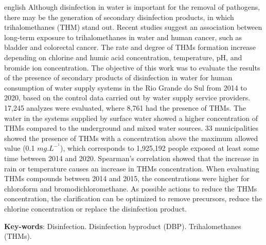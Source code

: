 \begin{resumo}[Abstract]
\begin{otherlanguage*}{english}
	Although disinfection in water is important for the removal of pathogens, there may be the generation of secondary disinfection products, in which trihalomethanes (THM) stand out. Recent studies suggest an association between long-term exposure to trihalomethanes in water and human cancer, such as bladder and colorectal cancer. The rate and degree of THMs formation increase depending on chlorine and humic acid concentration, temperature, pH, and bromide ion concentration. The objective of this work was to evaluate the results of the presence of secondary products of disinfection in water for human consumption of water supply systems in the Rio Grande do Sul from 2014 to 2020, based on the control data carried out by water supply service providers. 17,245 analyzes were evaluated, where 8,761 had the presence of THMs. The water in the systems supplied by surface water showed a higher concentration of THMs compared to the underground and mixed water sources. 33 municipalities showed the presence of THMs with a concentration above the maximum allowed value (0.1 $mg.L^-^1$), which corresponds to 1,925,192 people exposed at least some time between 2014 and 2020. Spearman's correlation showed that the increase in rain or temperature causes an increase in THMs concentration. When evaluating THMs compounds between 2014 and 2015, the concentrations were higher for chloroform and bromodichloromethane. As possible actions to reduce the THMs concentration, the clarification can be optimized to remove precursors, reduce the chlorine concentration or replace the disinfection product. 
    
	\vspace{\onelineskip}
 
	\noindent 
	\textbf{Key-words}: Disinfection. Disinfection byproduct (DBP). Trihalomethanes (THMs). 
\end{otherlanguage*}
\end{resumo}

 
